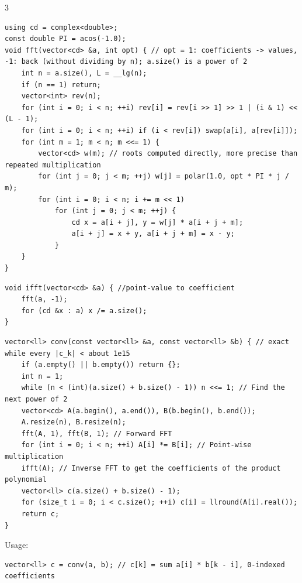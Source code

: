 \documentclass[8pt]{extarticle}
\begin{document}
\begin{multicols*}{3}
\begin{lstlisting}
using cd = complex<double>;
const double PI = acos(-1.0);
void fft(vector<cd> &a, int opt) { // opt = 1: coefficients -> values, -1: back (without dividing by n); a.size() is a power of 2
    int n = a.size(), L = __lg(n);
    if (n == 1) return;
    vector<int> rev(n);
    for (int i = 0; i < n; ++i) rev[i] = rev[i >> 1] >> 1 | (i & 1) << (L - 1);
    for (int i = 0; i < n; ++i) if (i < rev[i]) swap(a[i], a[rev[i]]);
    for (int m = 1; m < n; m <<= 1) {
        vector<cd> w(m); // roots computed directly, more precise than repeated multiplication
        for (int j = 0; j < m; ++j) w[j] = polar(1.0, opt * PI * j / m);
        for (int i = 0; i < n; i += m << 1)
            for (int j = 0; j < m; ++j) {
                cd x = a[i + j], y = w[j] * a[i + j + m];
                a[i + j] = x + y, a[i + j + m] = x - y;
            }
    }
}
\end{lstlisting}

\begin{lstlisting}
void ifft(vector<cd> &a) { //point-value to coefficient
    fft(a, -1);
    for (cd &x : a) x /= a.size();
}
\end{lstlisting}

\begin{lstlisting}
vector<ll> conv(const vector<ll> &a, const vector<ll> &b) { // exact while every |c_k| < about 1e15
    if (a.empty() || b.empty()) return {};
    int n = 1;
    while (n < (int)(a.size() + b.size() - 1)) n <<= 1; // Find the next power of 2
    vector<cd> A(a.begin(), a.end()), B(b.begin(), b.end());
    A.resize(n), B.resize(n);
    fft(A, 1), fft(B, 1); // Forward FFT
    for (int i = 0; i < n; ++i) A[i] *= B[i]; // Point-wise multiplication
    ifft(A); // Inverse FFT to get the coefficients of the product polynomial
    vector<ll> c(a.size() + b.size() - 1);
    for (size_t i = 0; i < c.size(); ++i) c[i] = llround(A[i].real());
    return c;
}
\end{lstlisting}

Usage:

\begin{lstlisting}
vector<ll> c = conv(a, b); // c[k] = sum a[i] * b[k - i], 0-indexed coefficients
\end{lstlisting}


\end{multicols*}
\end{document}
